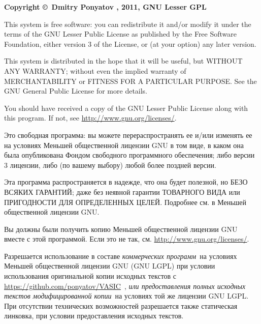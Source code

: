 \textbf{Copyright \copyright\ Dmitry Ponyatov , 2011, GNU Lesser GPL}

\bigskip

This system is free software: you can redistribute it and/or modify
it under the terms of the GNU Lesser Public License as published by
the Free Software Foundation, either version 3 of the License, or
(at your option) any later version.

This system is distributed in the hope that it will be useful,
but WITHOUT ANY WARRANTY; without even the implied warranty of
MERCHANTABILITY or FITNESS FOR A PARTICULAR PURPOSE.  See the
GNU General Public License for more details.

You should have received a copy of the GNU Lesser Public License
along with this program.  If not, see \url{http://www.gnu.org/licenses/}.

\bigskip

Это свободная программа: вы можете перераспространять ее и/или изменять
   ее на условиях Меньшей общественной лицензии GNU в том виде, в каком
   она была опубликована Фондом свободного программного обеспечения; либо
   версии 3 лицензии, либо (по вашему выбору) любой более поздней версии.

   Эта программа распространяется в надежде, что она будет полезной,
   но БЕЗО ВСЯКИХ ГАРАНТИЙ; даже без неявной гарантии ТОВАРНОГО ВИДА
   или ПРИГОДНОСТИ ДЛЯ ОПРЕДЕЛЕННЫХ ЦЕЛЕЙ. Подробнее см. в Меньшей
   общественной лицензии GNU.

   Вы должны были получить копию Меньшей общественной лицензии GNU
   вместе с этой программой. Если это не так, см.
   \url{http://www.gnu.org/licenses/}.

\bigskip
Разрешается использование в составе \emph{коммерческих программ}\ на условиях
Меньшей общественной лицензии GNU (GNU LGPL)
при условии использования оригинальной копии
исходных текстов с \url{https://github.com/ponyatov/VASIC}\ ,
\emph{или предоставления полных исходных текстов модифицированной копии}\ на 
условиях той же лицензии GNU LGPL. При отсутствии технических
возможностей
разрешается также статическая линковка, при условии предоставления исходных
текстов.


